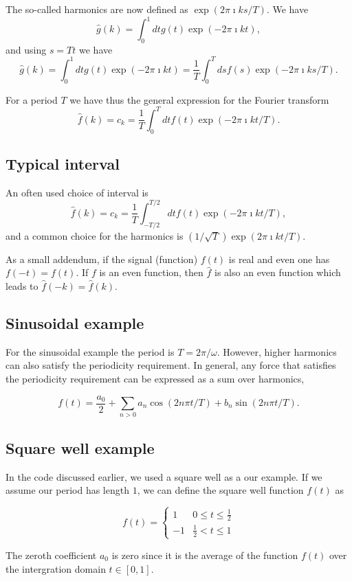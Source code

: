 \documentclass[%
oneside,                 %
final,                   %
10pt]{article}
\begin{document}
The so-called harmonics are now defined as $\exp{(2\pi\imath ks/T)}$.
We have 
\[
\hat{g}(k)=\int_0^1 dt g(t)\exp{(-2\pi\imath kt)},
\]
and using $s=Tt$ we have
\[
\hat{g}(k)=\int_0^1 dt g(t)\exp{(-2\pi\imath kt)}=\frac{1}{T}\int_0^T ds f(s)\exp{(-2\pi\imath ks/T)}.
\]

For a period $T$ we have thus the general expression for the Fourier transform
\[
\hat{f}(k)=c_k=\frac{1}{T}\int_0^T dt f(t)\exp{(-2\pi\imath kt/T)}.
\]

\subsection{Typical interval}

An often used choice of interval is
\[
\hat{f}(k)=c_k=\frac{1}{T}\int_{-T/2}^{T/2} dt f(t)\exp{(-2\pi\imath kt/T)},
\]
and a common choice for the harmonics is $(1/\sqrt{T})\exp{(2\pi\imath kt/T)}$.

As a small addendum, if the signal (function) $f(t)$ is real and even one has $f(-t)=f(t)$. If $f$ is an even function, then $\hat{f}$ is also an even function which leads to $\hat{f}(-k)=\hat{f}(k)$. 

\subsection{Sinusoidal example}
For the sinusoidal example the
period is $T=2\pi/\omega$. However, higher harmonics can also
satisfy the periodicity requirement. In general, any force that
satisfies the periodicity requirement can be expressed as a sum over
harmonics,

\[
f(t)=\frac{a_0}{2}+\sum_{n>0} a_n\cos(2n\pi t/T)+b_n\sin(2n\pi t/T).
\]

\subsection{Square well example}

In the code discussed earlier, we used a square well as a our
example. If we assume our period has length $1$, we can define the
square well function $f(t)$ as

\[
f(t)=\left\{\begin{array}{cc} 1 & 0 \le t \le \frac{1}{2} \\
                              -1 & \frac{1}{2} < t \le 1\end{array}\right.
\]

The zeroth coefficient $a_0$ is zero since it is the average of the function $f(t)$ over the intergration domain $t\in [0,1]$.
\end{document}
